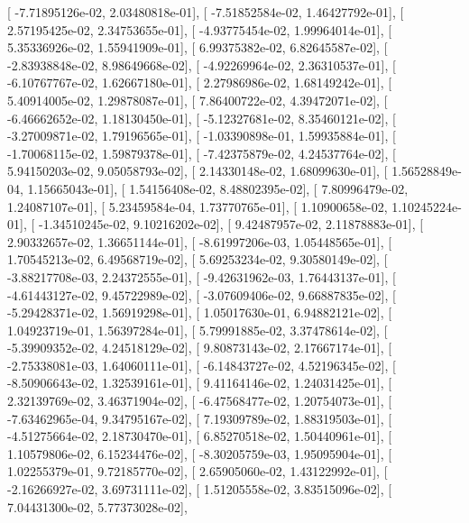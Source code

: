 \documentclass{article}
\begin{document}
       [ -7.71895126e-02,   2.03480818e-01],
       [ -7.51852584e-02,   1.46427792e-01],
       [  2.57195425e-02,   2.34753655e-01],
       [ -4.93775454e-02,   1.99964014e-01],
       [  5.35336926e-02,   1.55941909e-01],
       [  6.99375382e-02,   6.82645587e-02],
       [ -2.83938848e-02,   8.98649668e-02],
       [ -4.92269964e-02,   2.36310537e-01],
       [ -6.10767767e-02,   1.62667180e-01],
       [  2.27986986e-02,   1.68149242e-01],
       [  5.40914005e-02,   1.29878087e-01],
       [  7.86400722e-02,   4.39472071e-02],
       [ -6.46662652e-02,   1.18130450e-01],
       [ -5.12327681e-02,   8.35460121e-02],
       [ -3.27009871e-02,   1.79196565e-01],
       [ -1.03390898e-01,   1.59935884e-01],
       [ -1.70068115e-02,   1.59879378e-01],
       [ -7.42375879e-02,   4.24537764e-02],
       [  5.94150203e-02,   9.05058793e-02],
       [  2.14330148e-02,   1.68099630e-01],
       [  1.56528849e-04,   1.15665043e-01],
       [  1.54156408e-02,   8.48802395e-02],
       [  7.80996479e-02,   1.24087107e-01],
       [  5.23459584e-04,   1.73770765e-01],
       [  1.10900658e-02,   1.10245224e-01],
       [ -1.34510245e-02,   9.10216202e-02],
       [  9.42487957e-02,   2.11878883e-01],
       [  2.90332657e-02,   1.36651144e-01],
       [ -8.61997206e-03,   1.05448565e-01],
       [  1.70545213e-02,   6.49568719e-02],
       [  5.69253234e-02,   9.30580149e-02],
       [ -3.88217708e-03,   2.24372555e-01],
       [ -9.42631962e-03,   1.76443137e-01],
       [ -4.61443127e-02,   9.45722989e-02],
       [ -3.07609406e-02,   9.66887835e-02],
       [ -5.29428371e-02,   1.56919298e-01],
       [  1.05017630e-01,   6.94882121e-02],
       [  1.04923719e-01,   1.56397284e-01],
       [  5.79991885e-02,   3.37478614e-02],
       [ -5.39909352e-02,   4.24518129e-02],
       [  9.80873143e-02,   2.17667174e-01],
       [ -2.75338081e-03,   1.64060111e-01],
       [ -6.14843727e-02,   4.52196345e-02],
       [ -8.50906643e-02,   1.32539161e-01],
       [  9.41164146e-02,   1.24031425e-01],
       [  2.32139769e-02,   3.46371904e-02],
       [ -6.47568477e-02,   1.20754073e-01],
       [ -7.63462965e-04,   9.34795167e-02],
       [  7.19309789e-02,   1.88319503e-01],
       [ -4.51275664e-02,   2.18730470e-01],
       [  6.85270518e-02,   1.50440961e-01],
       [  1.10579806e-02,   6.15234476e-02],
       [ -8.30205759e-03,   1.95095904e-01],
       [  1.02255379e-01,   9.72185770e-02],
       [  2.65905060e-02,   1.43122992e-01],
       [ -2.16266927e-02,   3.69731111e-02],
       [  1.51205558e-02,   3.83515096e-02],
       [  7.04431300e-02,   5.77373028e-02],
\end{document}
